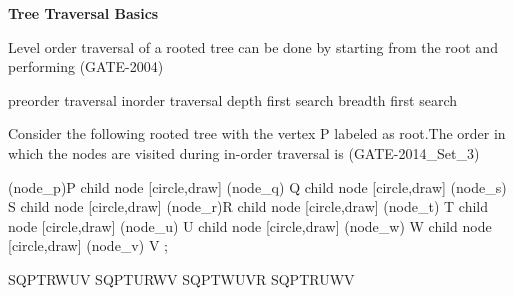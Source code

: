 
\centerline{\textbf{ \LARGE Tree Traversal Basics}}

\begin{questyle}
  \question  Level order traversal of a rooted tree can be done by starting from the root and performing  (GATE-2004)

  \begin{choices}
    \choice         preorder traversal
    \choice         inorder traversal
    \choice         depth first search
    \CorrectChoice  breadth first search
  \end{choices}
\end{questyle}

\begin{questyle}
  \question  Consider the following rooted tree with the vertex P labeled as root.The order
            in which the nodes are visited during in-order traversal is  (GATE-2014\_Set\_3)

\begin{myTree}
   (node_p){P}
    child
    {
        node [circle,draw] (node_q) {Q}
        child
        {
            node [circle,draw] (node_s) {S}
        }
    }
    child
    {
        node [circle,draw] (node_r){R}
        child
        {
            node [circle,draw] (node_t) {T}
        }
        child
        {
            node [circle,draw] (node_u) {U}
            child
            {
              node [circle,draw] (node_w) {W}
            }
        }
        child
        {
            node [circle,draw] (node_v) {V}
        }
    };
\end{myTree}

  \begin{oneparchoices}
    \CorrectChoice  SQPTRWUV
    \choice         SQPTURWV
    \choice         SQPTWUVR
    \choice         SQPTRUWV
  \end{oneparchoices}
\end{questyle}


